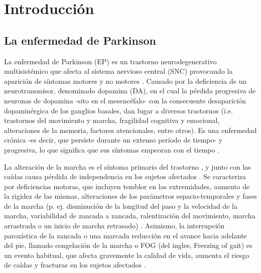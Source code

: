 \chapter{Introducción}

\section{La enfermedad de Parkinson}

La enfermedad de Parkinson (EP) es un trastorno neurodegenerativo multisistémico que afecta al sistema nervioso central (SNC) provocando la aparición de síntomas motores y no motores \cite{E2004}. Causado por la deficiencia de un neurotransmisor, denominado \gls{dopamina} (DA), en el cual la pérdida progresiva de neuronas de dopamina -sito en el mesencéfalo- con la consecuente desaparición dopaminérgica de los ganglios basales, dan lugar a diversos trastornos (i.e. trastornos del movimiento y marcha, fragilidad cognitiva y emocional, alteraciones de la memoria, factores atencionales, entre otros). Es una enfermedad crónica -es decir, que persiste durante un extenso período de tiempo- y progresiva, lo que significa que sus síntomas empeoran con el tiempo \cite{E2004}.  

La alteración de la marcha es el síntoma primario del trastorno \cite{Jankovic}, y junto con las caídas causa pérdida de independencia en los sujetos afectados \cite{Ashburn}. Se caracteriza por deficiencias motoras, que incluyen temblor en las extremidades, aumento de la rigidez de las mismas, alteraciones de los parámetros espacio-temporales y fases de la marcha (p. ej. disminución de la longitud del paso y la velocidad de la marcha, variabilidad de zancada a zancada, ralentización del movimiento, marcha arrastrada o un inicio de marcha retrasado) \cite{Rogers,Stamatakis,Hausdorff,Lord}. Asimismo, la interrupción paroxística de la zancada o una marcada reducción en el avance hacia adelante del pie, llamado congelación de la marcha o FOG (del ingles, Freezing of gait) es un evento habitual, que afecta gravemente la calidad de vida, aumenta el riesgo de caídas y fracturas en los sujetos afectados \cite{Perez-Lloret2014,Bloem2004}.

